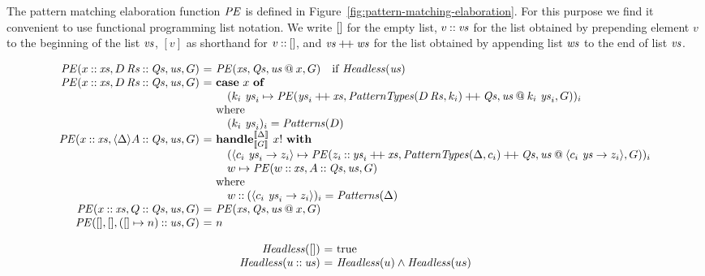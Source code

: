 \documentclass{sigplanconf}
\makeatletter
\newcommand{\sem}[1]{\llbracket{#1}\rrbracket}
\newcommand\ba{\begin{array}}
\newcommand\ea{\end{array}}
\newcommand{\bl}{\ba[t]{@{}l@{}}}
\newcommand{\el}{\ea}
\newenvironment{equations}{\[\ba{@{}r@{~}c@{~}l@{}}}{\ea\]\ignorespacesafterend}
\newcommand{\key}[1]{\mathbf{#1}} %
\newcommand{\handleSymbol}{\rightarrow}
\newcommand{\handle}[2]{{#1} \handleSymbol {#2}}
\newcommand{\adj}{\Delta}
\newcommand{\effin}[1]{\langle {#1} \rangle}
\makeatother
\begin{document}
The pattern matching elaboration function $\mathit{PE}$ is defined in
Figure~\ref{fig:pattern-matching-elaboration}. For this purpose we
find it convenient to use functional programming list notation. We
write $[]$ for the empty list, $v \mathbin{::} \mathit{vs}$ for the list
obtained by prepending element $v$ to the beginning of the list $\mathit{vs}$,
$[v]$ as shorthand for $v \mathbin{::} []$, and $\mathit{vs} \mathbin{+\!+} \mathit{ws}$ for
the list obtained by appending list $\mathit{ws}$ to the end of list $\mathit{vs}$.
%
\begin{figure*}
\begin{equations}
\PE(x \cons \xs, D\,\Rs \cons \Qs, \us, G) &=&
    \bl
    \PE(\xs, \Qs, \us \proj x, G)  \quad \text{if } \hdless(\us)
    \el \\
\PE(x \cons \xs, D\,\Rs \cons \Qs, \us, G) &=&
    \bl
    \key{case}~x~\key{of}\\
    \quad
      (k_i~\ys_i \mapsto \PE(\ys_i \concat \xs, \PatternTypes(D\,\Rs, k_i) \concat \Qs, \us \proj k_i~\ys_i, G))_i\\
    \text{where} \\
    \quad (k_i~\ys_i)_i = \Patterns(D) \\
    \el\\
\PE(x \cons \xs, \effin{\adj}A \cons \Qs, \us, G) &=&
    \bl
    \key{handle}^{\sem{\adj}}_{\sem{G}}~x!~\key{with} \\
    \quad
    \bl
      (\effin{\handle{c_i~\ys_i}{z_i}} \mapsto
         \PE(z_i \cons \ys_i \concat \xs, \PatternTypes(\adj, c_i) \concat \Qs, \us \proj \effin{\handle{c_i~\ys}{z_i}}, G))_i \\
      w \mapsto \PE(w \cons \xs, A \cons \Qs, \us, G) \\
    \el \\
    \text{where} \\
    \quad w \cons (\effin{\handle{c_i~\ys_i}{z_i}})_i = \Patterns(\adj) \\
    \el \\
\PE(x \cons \xs, Q \cons \Qs, \us, G) &=& \PE(\xs, \Qs, \us \proj x, G) \\
\PE(\emptylist, \emptylist, (\emptylist \mapsto n) \cons \us, G) &=& n \\
\end{equations}

\begin{equations}
  \hdless(\emptylist) &=& \true\\
  \hdless(u \cons \us) &=& \hdless(u) \wedge \hdless(us)\\[1ex]


\end{equations}
\end{figure*}
\end{document}
